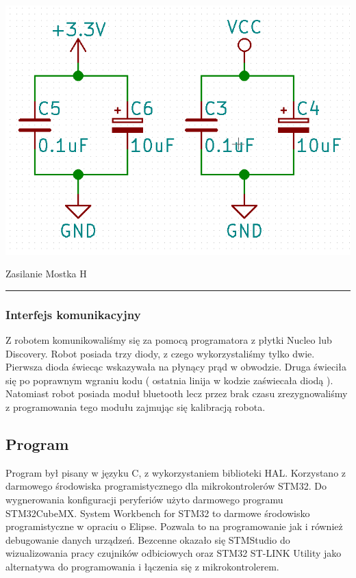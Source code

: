 \documentclass[12pt,a4paper]{article}
\begin{document}
\begin{center}
\includegraphics[scale=0.3]{zasilanietbka.png}
\caption{Zasilanie Mostka H}
\vspace*{1cm}
\noindent \rule{\linewidth}{0.4mm}
\end{center}

\subsubsection{Interfejs komunikacyjny}

Z robotem komunikowaliśmy się za pomocą programatora z płytki Nucleo lub Discovery. Robot posiada trzy diody, z czego wykorzystaliśmy tylko dwie. Pierwsza dioda świecąc wskazywała na płynący prąd w obwodzie. Druga świeciła się po poprawnym wgraniu kodu ( ostatnia linija w kodzie zaświecała diodą ). Natomiast robot posiada moduł bluetooth lecz przez brak czasu zrezygnowaliśmy z programowania tego modułu zajmując się kalibracją robota.

\subsection{Program} 

Program był pisany w języku C, z wykorzystaniem biblioteki HAL. Korzystano z darmowego środowiska programistycznego dla mikrokontrolerów STM32. Do wygnerowania konfiguracji peryferiów użyto darmowego programu STM32CubeMX. System Workbench for STM32 to darmowe środowisko programistyczne w opraciu o Elipse. Pozwala to na programowanie jak i również debugowanie danych urządzeń. Bezcenne okazało się STMStudio do wizualizowania pracy czujników odbiciowych oraz STM32 ST-LINK Utility jako alternatywa do programowania i łączenia się z mikrokontrolerem.
\end{document}
